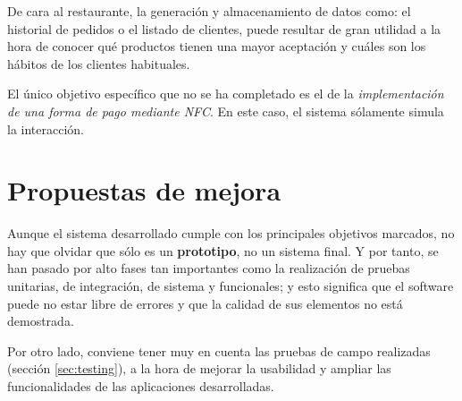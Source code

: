 De cara al restaurante, la generación y almacenamiento de datos como: el 
historial de pedidos o el listado de clientes, puede resultar de gran utilidad
a la hora de conocer qué productos tienen una mayor aceptación y cuáles son
los hábitos de los clientes habituales.

El único objetivo específico que no se ha completado es el de la 
\emph{implementación de una forma de pago mediante \acs{NFC}}. En este caso,
el sistema sólamente simula la interacción.

\section{Propuestas de mejora}
Aunque el sistema desarrollado cumple con los principales objetivos marcados,
no hay que olvidar que sólo es un \textbf{prototipo}, no un sistema final. Y 
por tanto, se han pasado por alto fases tan importantes como la realización de
pruebas unitarias, de integración, de sistema y funcionales; y esto significa
que el software puede no estar libre de errores y que la calidad de sus
elementos no está demostrada.

Por otro lado, conviene tener muy en cuenta las pruebas de campo realizadas
(sección \ref{sec:testing}), a la hora de mejorar la usabilidad y ampliar las
funcionalidades de las aplicaciones desarrolladas.

